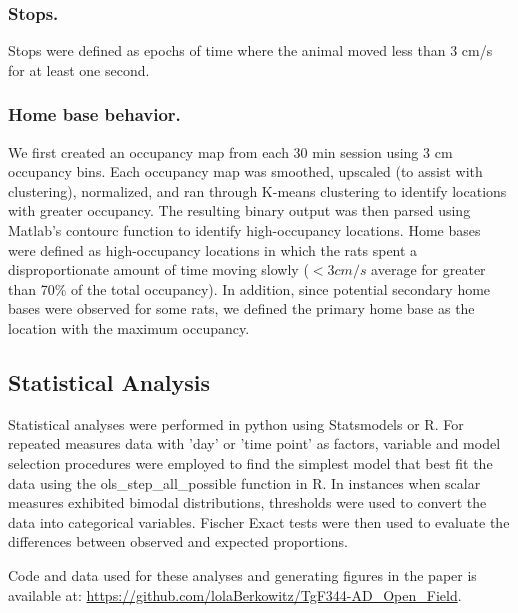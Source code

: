 \documentclass[fleqn,10pt]{wlscirep}
\begin{document}
\subsubsection*{Stops.} Stops were defined as epochs of time where the animal moved less than 3 cm/s for at least one second. 

\subsubsection*{Home base behavior.} 
We first created an occupancy map from each 30 min session using 3 cm occupancy bins. Each occupancy map was smoothed, upscaled (to assist with clustering), normalized, and ran through K-means clustering to identify locations with greater occupancy. The resulting binary output was then parsed using Matlab's contourc function to identify high-occupancy locations. Home bases were defined as high-occupancy locations in which the rats spent a disproportionate amount of time moving slowly ($< 3 cm/s$ average for greater than 70$\%$ of the total occupancy). In addition, since potential secondary home bases were observed for some rats, we defined the primary home base as the location with the maximum occupancy. 

\subsection*{Statistical Analysis} 
Statistical analyses were performed in python using Statsmodels or R. For repeated measures data with 'day' or 'time point' as factors, variable and model selection procedures were employed to find the simplest model that best fit the data using the ols_step_all_possible function in R. In instances when scalar measures exhibited bimodal distributions, thresholds were used to convert the data into categorical variables. Fischer Exact tests were then used to evaluate the differences between observed and expected proportions.

Code and data used for these analyses and generating figures in the paper is available at: \url{https://github.com/lolaBerkowitz/TgF344-AD_Open_Field}.





\end{document}
